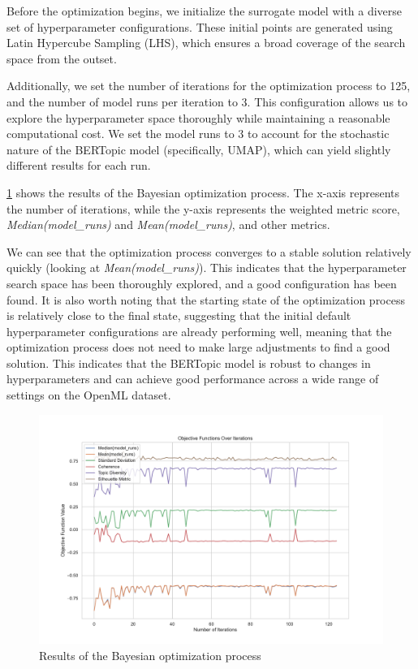 Before the optimization begins, we initialize the surrogate model with a diverse set of hyperparameter configurations. These initial points are generated using Latin Hypercube Sampling (LHS), which ensures a broad coverage of the search space from the outset.

Additionally, we set the number of iterations for the optimization process to 125, and the number of model runs per iteration to 3. This configuration allows us to explore the hyperparameter space thoroughly while maintaining a reasonable computational cost. We set the model runs to 3 to account for the stochastic nature of the BERTopic model (specifically, UMAP), which can yield slightly different results for each run.

\cref{fig:bayesian_optimization} shows the results of the Bayesian optimization process. The x-axis represents the number of iterations, while the y-axis represents the weighted metric score, \textit{Median(model\_runs)} and \textit{Mean(model\_runs)}, and other metrics. 

We can see that the optimization process converges to a stable solution relatively quickly (looking at \textit{Mean(model\_runs)}). This indicates that the hyperparameter search space has been thoroughly explored, and a good configuration has been found. It is also worth noting that the starting state of the optimization process is relatively close to the final state, suggesting that the initial default hyperparameter configurations are already performing well, meaning that the optimization process does not need to make large adjustments to find a good solution. This indicates that the BERTopic model is robust to changes in hyperparameters and can achieve good performance across a wide range of settings on the OpenML dataset.

\begin{figure}[h]
    \centering
    \includegraphics[width=1.0\textwidth]{figures/bayesian_optimization.pdf}
    \caption{Results of the Bayesian optimization process}
    \label{fig:bayesian_optimization}
\end{figure}

